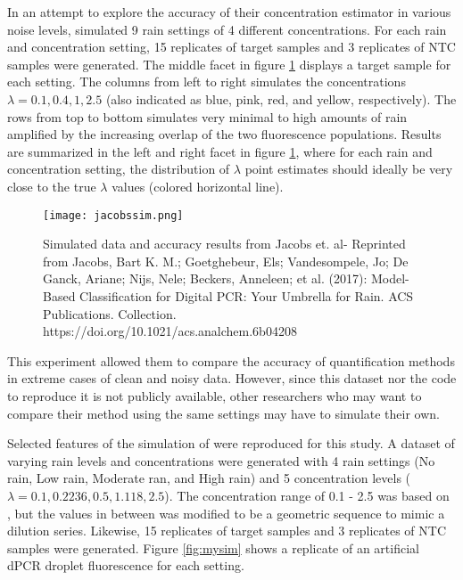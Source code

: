 In an attempt to explore the accuracy of their concentration estimator in various noise levels,  simulated 9 rain settings of 4 different concentrations. For each rain and concentration setting, 15 replicates of target samples and 3 replicates of NTC samples were generated. The middle facet in figure \ref{fig:jacobssim} displays a target sample for each setting. The columns from left to right simulates the concentrations \(\lambda = 0.1, 0.4, 1, 2.5\) (also indicated as blue, pink, red, and yellow, respectively). The rows from top to bottom simulates very minimal to high amounts of rain amplified by the increasing overlap of the two fluorescence populations. Results are summarized in the left and right facet in figure \ref{fig:jacobssim}, where for each rain and concentration setting, the distribution of \(\lambda\) point estimates should ideally be very close to the true \(\lambda\) values (colored horizontal line).

\begin{figure}[h]
    \centering
    \texttt{[image: jacobssim.png]}
    \caption[Simulated data and accuracy results from Jacobs et. al]{Simulated data and accuracy results from Jacobs et. al- Reprinted from Jacobs, Bart K. M.; Goetghebeur, Els; Vandesompele, Jo; De Ganck, Ariane; Nijs, Nele; Beckers, Anneleen; et al. (2017): Model-Based Classification for Digital PCR: Your Umbrella for Rain. ACS Publications. Collection. https://doi.org/10.1021/acs.analchem.6b04208}
        \label{fig:jacobssim}
\end{figure}

This experiment allowed them to compare the accuracy of quantification methods in extreme cases of clean and noisy data. However, since this dataset nor the code to reproduce it is not publicly available, other researchers who may want to compare their method using the same settings may have to simulate their own.

Selected features of the simulation of  were reproduced for this study. A dataset of varying rain levels and concentrations were generated with 4 rain settings (No rain, Low rain, Moderate ran, and High rain) and 5 concentration levels (\(\lambda = 0.1, 0.2236, 0.5, 1.118, 2.5\)). The concentration range of 0.1 - 2.5  was based on , but the values in between was modified to be a geometric sequence to mimic a dilution series. Likewise, 15 replicates of target samples and 3 replicates of NTC samples were generated. Figure \ref{fig:mysim} shows a replicate of an artificial dPCR droplet fluorescence for each setting.

